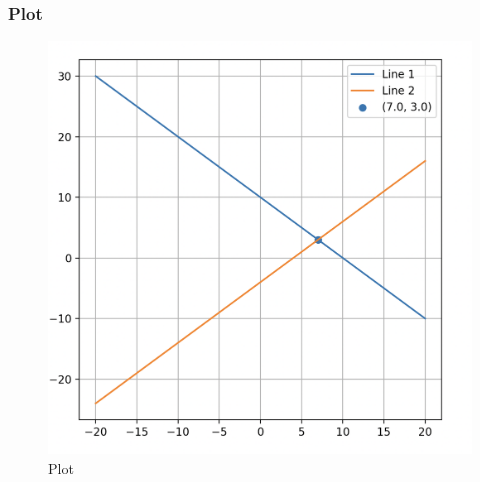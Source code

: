 \documentclass{beamer}
\begin{document}
\begin{frame}[fragile]
\frametitle{Plot}

\begin{figure}[H]
    \centering
    \includegraphics[width=0.6\columnwidth]{Figs/582.png}
    \caption{Plot}
    \label{fig:placeholder}
\end{figure}

\end{frame}
\end{document}
